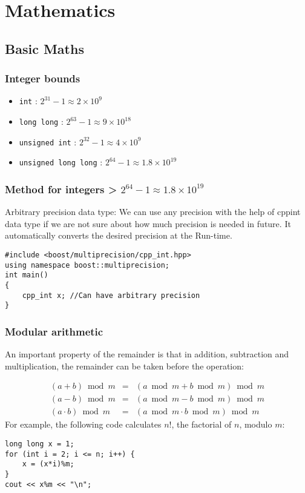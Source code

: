 \documentclass[twoside,12pt,a4paper,english]{book}
\theoremstyle{definition}
\theoremstyle{problemstyle}
\begin{document}
\part{Mathematics}
\chapter{Basic Maths}

\section{Integer bounds}

\begin{itemize}
    \item\texttt{int} :  $2^{31} - 1 \approx 2\times10^9$
    \item\texttt{long long} :  $2^{63} - 1 \approx 9\times10^{18}$
    \item\texttt{unsigned int} :  $2^{32} - 1 \approx 4\times10^9$
    \item\texttt{unsigned long long} :  $2^{64} - 1 \approx 1.8\times10^{19}$
\end{itemize}

\section{Method for integers > $2^{64} - 1 \approx 1.8\times10^{19}$}

Arbitrary precision data type: We can use any precision with the help of cppint data type if we are not sure about how much precision is needed in future. It automatically converts the desired precision at the Run-time.

\begin{lstlisting}
#include <boost/multiprecision/cpp_int.hpp>
using namespace boost::multiprecision;
int main()
{
    cpp_int x; //Can have arbitrary precision
}
\end{lstlisting}

\section{Modular arithmetic}

An important property of the remainder is that
in addition, subtraction and multiplication,
the remainder can be taken before the operation:

\[
\begin{array}{rcr}
(a+b) \bmod m & = & (a \bmod m + b \bmod m) \bmod m \\
(a-b) \bmod m & = & (a \bmod m - b \bmod m) \bmod m \\
(a \cdot b) \bmod m & = & (a \bmod m \cdot b \bmod m) \bmod m
\end{array}
\]
\linebreak
\linebreak
\linebreak
\linebreak
For example, the following code calculates $n!$,
the factorial of $n$, modulo $m$:
\begin{lstlisting}
long long x = 1;
for (int i = 2; i <= n; i++) {
    x = (x*i)%m;
}
cout << x%m << "\n";
\end{lstlisting}
\end{document}
